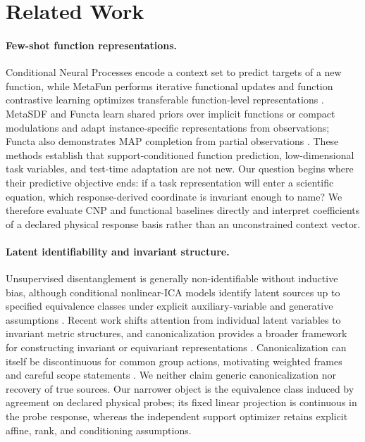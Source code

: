 \section{Related Work}
\label{sec:related-work}

\paragraph{Few-shot function representations.}
Conditional Neural Processes encode a context set to predict targets of a new
function, while MetaFun performs iterative functional updates and function
contrastive learning optimizes transferable function-level representations
\citep{garnelo2018conditional,xu2020metafun,gondal2021function}.  MetaSDF and
Functa learn shared priors over implicit functions or compact modulations and
adapt instance-specific representations from observations; Functa also
demonstrates MAP completion from partial observations
\citep{sitzmann2020metasdf,dupont2022functa}.  These methods establish that
support-conditioned function prediction, low-dimensional task variables, and
test-time adaptation are not new.  Our question begins where their predictive
objective ends: if a task representation will enter a scientific equation,
which response-derived coordinate is invariant enough to name?  We therefore
evaluate CNP and functional baselines directly and interpret coefficients of a
declared physical response basis rather than an unconstrained context vector.

\paragraph{Latent identifiability and invariant structure.}
Unsupervised disentanglement is generally non-identifiable without inductive
bias, although conditional nonlinear-ICA models identify latent sources up to
specified equivalence classes under explicit auxiliary-variable and generative assumptions
\citep{locatello2019challenging,khemakhem2020variational}.  Recent work shifts
attention from individual latent variables to invariant metric structures, and
canonicalization provides a broader framework for constructing invariant or
equivariant representations
\citep{syrota2025metric,ma2024canonicalization}.  Canonicalization can itself be
discontinuous for common group actions, motivating weighted frames and careful
scope statements \citep{dym2024equivariant}.  We neither claim generic
canonicalization nor recovery of true sources.  Our narrower object is the
equivalence class induced by agreement on declared physical probes; its fixed
linear projection is continuous in the probe response, whereas the independent
support optimizer retains explicit affine, rank, and conditioning assumptions.

